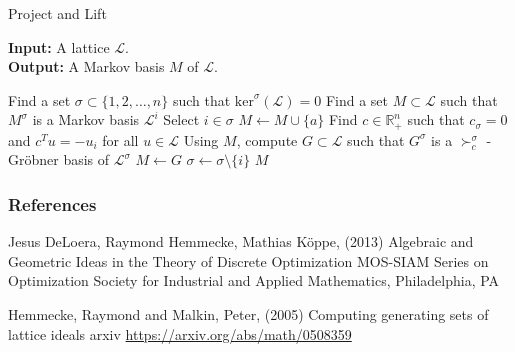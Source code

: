 \documentclass[9pt]{beamer}
\newcommand\R{\mathbb{R}}
\newcommand\set[1]{\{#1\}}
\theoremstyle{definition}
\begin{document}
\begin{frame}[fragile]{Project and Lift}
  
  \begin{algorithm}[H]
    \textbf{Input:} A lattice $\mathcal{L}$. \\
    \textbf{Output:} A Markov basis $M$ of $\mathcal{L}$.
    \begin{algorithmic}[1]
      \STATE Find a set $\sigma \subset \set{1, 2, \dots, n}$ such that $\text{ker}^{\sigma}(\mathcal{L}) = 0$
      \STATE Find a set $M \subset \mathcal{L}$ such that $M^{\sigma}$ is a Markov basis $\mathcal{L}^i$
      \WHILE{ $\sigma \neq \emptyset$}
      \STATE Select $i \in \sigma$
      \STATE $M \leftarrow M \cup \set{ a }$
      \ELSE
      \STATE Find $c \in \R^n_+$ such that $c_{\sigma} = 0$ and $c^{T} u = -u_i$ for all $u \in \mathcal{L}$
      \STATE Using $M$, compute $G \subset \mathcal{L}$ such that $G^{\sigma}$ is a $\succ_c^{\sigma}$ - Gr\"obner basis of $\mathcal{L}^{\sigma}$
      \STATE $M \leftarrow G$
      \ENDIF
      \STATE $\sigma \leftarrow \sigma \setminus \set{i}$
      \ENDWHILE
      \RETURN $M$
    \end{algorithmic}
  \end{algorithm}

\end{frame}



\begin{frame}
  \frametitle{References}
  \footnotesize{
    \begin{thebibliography}{99} %
     Jesus DeLoera, Raymond Hemmecke, Mathias K\"oppe, (2013)
    \newblock Algebraic and Geometric Ideas in the Theory of Discrete Optimization
    \newbloack MOS-SIAM Series on Optimization
    \newblock Society for Industrial and Applied Mathematics, Philadelphia, PA

     Hemmecke, Raymond and Malkin, Peter, (2005)
      \newblock Computing generating sets of lattice ideals
      \newblock arxiv \url{https://arxiv.org/abs/math/0508359}

    \end{thebibliography}
  }
\end{frame}

\end{document}
